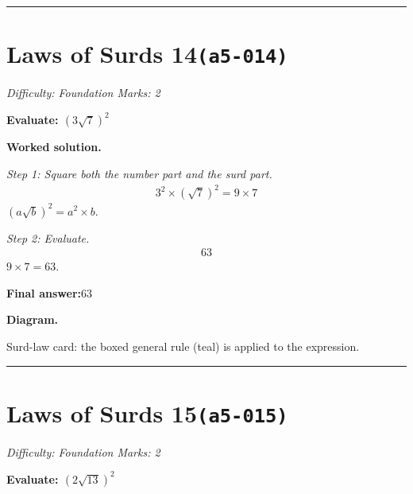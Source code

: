 \documentclass[11pt]{article}
\newcommand{\question}[1]{\par\medskip\noindent\textbf{#1}\par}
\begin{document}
\medskip\hrule

\section*{Laws of Surds 14\quad\small\texttt{(a5-014)}}
\textit{Difficulty: Foundation \quad\textbar\quad Marks: 2}

\question{Evaluate: \( (3\sqrt{7})^2 \)}

\textbf{Worked solution.}

\textit{Step 1: Square both the number part and the surd part.}
\[\begin{gathered}
3^2 \times (\sqrt{7})^2 = 9 \times 7
\end{gathered}\]
\( (a\sqrt{b})^2 = a^2 \times b \).

\textit{Step 2: Evaluate.}
\[\begin{gathered}
63
\end{gathered}\]
\( 9 \times 7 = 63 \).

\begin{answerbox}
\textbf{Final answer:}\quad \(\displaystyle 63\)
\end{answerbox}
\textbf{Diagram.}

\begin{center}
\end{center}
\small Surd-law card: the boxed general rule (teal) is applied to the expression.\normalsize

\medskip\hrule

\section*{Laws of Surds 15\quad\small\texttt{(a5-015)}}
\textit{Difficulty: Foundation \quad\textbar\quad Marks: 2}

\question{Evaluate: \( (2\sqrt{13})^2 \)}
\end{document}
